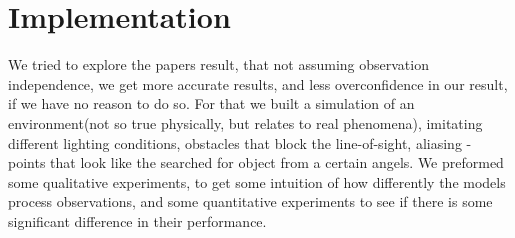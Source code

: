 \documentclass{article}
\begin{document}
	\section{Implementation}
	
	We tried to explore the papers result, that not assuming observation independence, we get more accurate results, and less overconfidence in our result, if we have no reason to do so.
	For that we built a simulation of an environment(not so true physically, but relates to real phenomena), imitating different lighting conditions, obstacles that block the line-of-sight, aliasing - points that look like the searched for object from a certain angels.
	We preformed some qualitative experiments, to get some intuition of how differently the models process observations, and some quantitative experiments to see if there is some significant difference in their performance.
	
\end{document}
